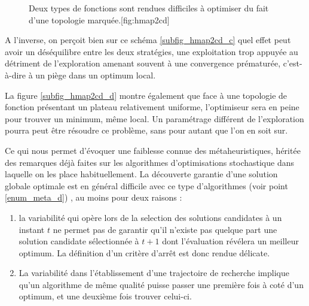 \begin{figure}[!htbp]
  \begin{sidecaption}[fortoc]{Deux types de fonctions sont rendues difficiles à optimiser du fait d'une topologie marquée.}[fig:hmap2cd]
  \centering
  \qquad
 \end{sidecaption}
\end{figure}

A l'inverse, on perçoit bien sur ce schéma \ref{subfig_hmap2cd_c} quel effet peut avoir un déséquilibre entre les deux stratégies, une exploitation trop appuyée au détriment de l'exploration amenant souvent à une convergence  prématurée, c'est-à-dire à un piège dans un optimum local.

La figure \ref{subfig_hmap2cd_d} montre également que face à une topologie de fonction présentant un plateau relativement uniforme, l'optimiseur sera en peine pour trouver un minimum, même local. Un paramétrage différent de l'exploration pourra peut être résoudre ce problème, sans pour autant que l'on en soit sur.

Ce qui nous permet d'évoquer une faiblesse connue des métaheuristiques, héritée des remarques déjà faites sur les algorithmes d'optimisations stochastique  dans laquelle on les place habituellement. La découverte garantie d'une solution globale optimale est en général difficile avec ce type d'algorithmes (voir point \ref{enum_meta_d}) , au moins pour deux raisons :

\begin{enumerate}
\item la variabilité qui opère lors de la selection des solutions candidates à un instant $t$ ne permet pas de garantir qu'il n'existe pas quelque part une solution candidate sélectionnée à $t+1$ dont l'évaluation révélera un meilleur optimum. La définition d'un critère d'arrêt est donc rendue délicate.
\item La variabilité dans l'établissement d'une trajectoire de recherche implique qu'un algorithme de même qualité puisse passer une première fois à coté d'un optimum, et une deuxième fois trouver celui-ci.
\end{enumerate}

